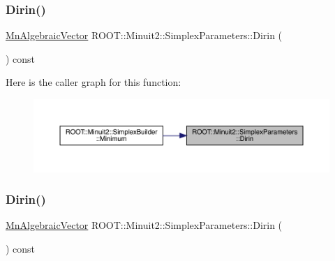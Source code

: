 \subsubsection{\texorpdfstring{Dirin()}{Dirin()}\hspace{0.1cm}{\footnotesize\ttfamily [1/2]}}
{\footnotesize\ttfamily \mbox{\hyperlink{namespaceROOT_1_1Minuit2_a62ed97730a1ca8d3fbaec64a19aa11c9}{Mn\+Algebraic\+Vector}} R\+O\+O\+T\+::\+Minuit2\+::\+Simplex\+Parameters\+::\+Dirin (\begin{DoxyParamCaption}{ }\end{DoxyParamCaption}) const}

Here is the caller graph for this function\+:\nopagebreak
\begin{figure}[H]
\begin{center}
\leavevmode
\includegraphics[width=350pt]{d7/da2/classROOT_1_1Minuit2_1_1SimplexParameters_a40e7b3b27280a376a063a1c81904cc75_icgraph}
\end{center}
\end{figure}
\mbox{\label{classROOT_1_1Minuit2_1_1SimplexParameters_a40e7b3b27280a376a063a1c81904cc75}} 
\subsubsection{\texorpdfstring{Dirin()}{Dirin()}\hspace{0.1cm}{\footnotesize\ttfamily [2/2]}}
{\footnotesize\ttfamily \mbox{\hyperlink{namespaceROOT_1_1Minuit2_a62ed97730a1ca8d3fbaec64a19aa11c9}{Mn\+Algebraic\+Vector}} R\+O\+O\+T\+::\+Minuit2\+::\+Simplex\+Parameters\+::\+Dirin (\begin{DoxyParamCaption}{ }\end{DoxyParamCaption}) const}

\mbox{\label{classROOT_1_1Minuit2_1_1SimplexParameters_ad71f372dd3873cbf351dc8eddc3a9c9a}} 
